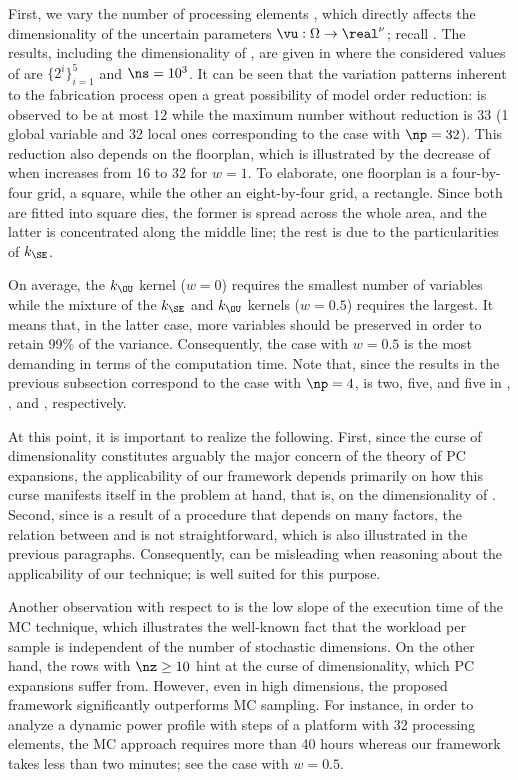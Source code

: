 First, we vary the number of processing elements \np, which directly affects the
dimensionality of the uncertain parameters $\vu: \Omega \to \real^\nu$; recall
. The results, including the dimensionality
\nz of \vz, are given in  where the
considered values of \np are $\{ 2^i \}_{i = 1}^5$ and $\ns = 10^3$. It can be
seen that the variation patterns inherent to the fabrication process
\cite{cheng2011} open a great possibility of model order reduction: \nz is
observed to be at most 12 while the maximum number without reduction is 33 (1
global variable and 32 local ones corresponding to the case with $\np = 32$).
This reduction also depends on the floorplan, which is illustrated by the
decrease of \nz when \np increases from 16 to 32 for $w = 1$. To elaborate, one
floorplan is a four-by-four grid, a square, while the other an eight-by-four
grid, a rectangle. Since both are fitted into square dies, the former is spread
across the whole area, and the latter is concentrated along the middle line; the
rest is due to the particularities of $k_\SE$.

On average, the $k_\OU$ kernel ($w = 0$) requires the smallest number of
variables while the mixture of the $k_\SE$ and $k_\OU$ kernels ($w = 0.5$)
requires the largest. It means that, in the latter case, more variables should
be preserved in order to retain 99\% of the variance. Consequently, the case
with $w = 0.5$ is the most demanding in terms of the computation time. Note
that, since the results in the previous subsection correspond to the case with
$\np = 4$, \nz is two, five, and five in ,
, and ,
respectively.

At this point, it is important to realize the following. First, since the curse
of dimensionality constitutes arguably the major concern of the theory of
\ac{PC} expansions, the applicability of our framework depends primarily on how
this curse manifests itself in the problem at hand, that is, on the
dimensionality \nz of \vz. Second, since \vz is a result of a procedure that
depends on many factors, the relation between \vu and \vz is not
straightforward, which is also illustrated in the previous paragraphs.
Consequently, \nu can be misleading when reasoning about the applicability of
our technique; \nz is well suited for this purpose.

Another observation with respect to  is the
low slope of the execution time of the \ac{MC} technique, which illustrates the
well-known fact that the workload per sample is independent of the number of
stochastic dimensions. On the other hand, the rows with $\nz \geq 10$ hint at
the curse of dimensionality, which \ac{PC} expansions suffer from. However, even
in high dimensions, the proposed framework significantly outperforms \ac{MC}
sampling. For instance, in order to analyze a dynamic power profile with
 steps of a platform with 32 processing elements, the \ac{MC}
approach requires more than 40 hours whereas our framework takes less than two
minutes; see the case with $w = 0.5$.

